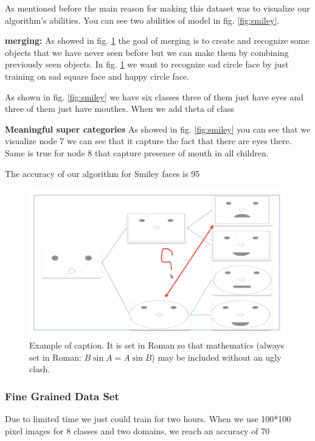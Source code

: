 \documentclass[10pt,twocolumn,letterpaper]{article}
\begin{document}
 As mentioned before the main reason for making this dataset was to visualize our algorithm's abilities. You can see two abilities of model in fig. \ref{fig:smiley}.
 
\textbf{merging:} As showed in fig. \ref{merge} the goal of merging is to create and recognize some objects that we have never seen before but we can make them by combining previously seen objects. In fig. \ref{merge} we want to recognize sad circle face by just training on sad square face and happy circle face.

As shown in fig. \ref{fig:smiley} we have six classes three of them just have eyes and three of them just have mouthes. When we add theta of class 
 
\textbf{Meaningful super categories} As showed in fig. \ref{fig:smiley} you can see that we visualize node 7 we can see that it capture the fact that there are eyes there. Same is true for node 8 that capture presence of mouth in all children.

The accuracy of our algorithm for Smiley faces is 95%
   
 \begin{figure}[t]
 	\begin{center}
 		\includegraphics[width=0.8\linewidth]{merge}
 	\end{center}
 	\caption{Example of caption.  It is set in Roman so that mathematics
 		(always set in Roman: $B \sin A = A \sin B$) may be included without an
 		ugly clash.}
 	\label{merge}
 \end{figure}
 
 


 \subsubsection{Fine Grained Data Set}
Due to limited time we just could train for two hours. When we use 100*100 pixel images for 8 classes and two domains, we reach an accuracy of 70%
\end{document}

